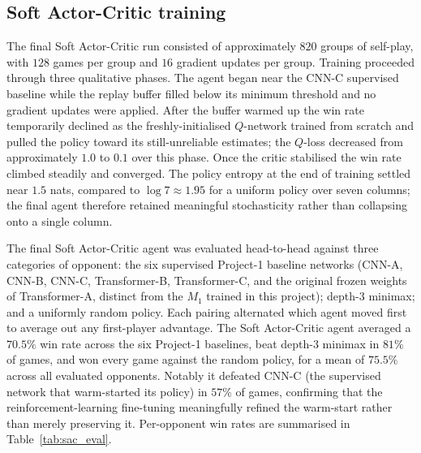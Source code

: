 \documentclass[11pt]{article}
\begin{document}
\subsection{Soft Actor-Critic training}
\label{ssec:sac_results}

The final Soft Actor-Critic run consisted of approximately $820$ groups
of self-play, with $128$ games per group and $16$ gradient updates per
group. Training proceeded through three qualitative phases. The agent
began near the CNN-C supervised baseline while the replay
buffer filled below its minimum threshold and no gradient updates were
applied. After the buffer warmed up the win rate temporarily declined
as the freshly-initialised $Q$-network trained from scratch and pulled
the policy toward its still-unreliable estimates; the $Q$-loss
decreased from approximately $1.0$ to $0.1$ over this phase. Once the
critic stabilised the win rate climbed steadily and converged. The
policy entropy at the end of training settled near $1.5$ nats, compared
to $\log 7 \approx 1.95$ for a uniform policy over seven columns; the
final agent therefore retained meaningful stochasticity rather than
collapsing onto a single column.

The final Soft Actor-Critic agent was evaluated head-to-head against
three categories of opponent: the six supervised Project-1 baseline
networks (CNN-A, CNN-B, CNN-C, Transformer-B, Transformer-C, and the
original frozen weights of Transformer-A, distinct from the $M_1$
trained in this project);
depth-$3$ minimax; and a uniformly random policy. Each pairing
alternated which agent moved first to average out any first-player
advantage. The Soft Actor-Critic agent averaged a $70.5\%$ win rate
across the six Project-1 baselines, beat depth-$3$ minimax in $81\%$
of games, and won every game against the random policy, for a mean of
$75.5\%$ across all evaluated opponents. Notably it defeated CNN-C
(the supervised network that warm-started its policy) in $57\%$ of
games,
confirming that the reinforcement-learning fine-tuning meaningfully
refined the warm-start rather than merely preserving it. Per-opponent
win rates are summarised in Table~\ref{tab:sac_eval}.
\end{document}
